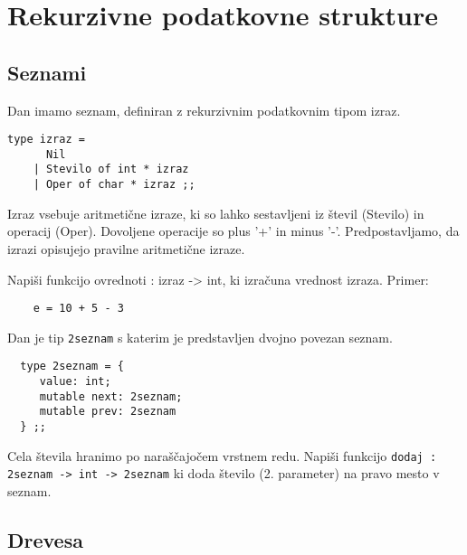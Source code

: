 
\section{Rekurzivne podatkovne strukture}

\subsection{Seznami}
\begin{ex}
Dan imamo seznam, definiran z rekurzivnim podatkovnim tipom izraz. 
\begin{lstlisting}
type izraz = 
      Nil 
    | Stevilo of int * izraz 
    | Oper of char * izraz ;; 
\end{lstlisting}
Izraz vsebuje aritmeti\v cne izraze, ki so lahko sestavljeni iz \v stevil (Stevilo) in operacij (Oper). Dovoljene operacije so plus '+' in minus '-'. Predpostavljamo, da izrazi opisujejo pravilne aritmeti\v cne izraze.

Napi\v si funkcijo ovrednoti : izraz -> int, ki izra\v cuna vrednost izraza.
Primer: 
\begin{lstlisting} 
    e = 10 + 5 - 3
\end{lstlisting}

\end{ex}
\begin{ex}
  Dan je tip \lstinline{2seznam} s katerim je predstavljen dvojno povezan
  seznam.

  \begin{lstlisting}
  type 2seznam = {
     value: int;
     mutable next: 2seznam;
     mutable prev: 2seznam
  } ;;
  \end{lstlisting}

  Cela \v stevila hranimo po nara\v s\v cajo\v cem vrstnem
  redu. Napi\v si funkcijo \lstinline{dodaj : 2seznam -> int -> 2seznam}
  ki doda \v stevilo (2. parameter) na pravo mesto v seznam.


\end{ex} 

\subsection{Drevesa}


